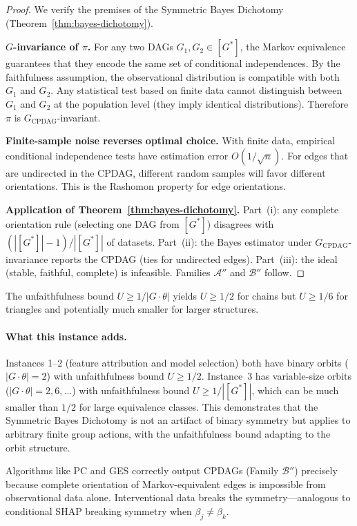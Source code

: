 \documentclass{article}
\begin{document}
\begin{proof}
We verify the premises of the Symmetric Bayes Dichotomy (Theorem~\ref{thm:bayes-dichotomy}).

\textbf{$G$-invariance of $\pi$.} For any two DAGs $G_1, G_2 \in [G^*]$, the Markov equivalence guarantees that they encode the same set of conditional independences. By the faithfulness assumption, the observational distribution is compatible with both $G_1$ and $G_2$. Any statistical test based on finite data cannot distinguish between $G_1$ and $G_2$ at the population level (they imply identical distributions). Therefore $\pi$ is $G_{\text{CPDAG}}$-invariant.

\textbf{Finite-sample noise reverses optimal choice.} With finite data, empirical conditional independence tests have estimation error $O(1/\sqrt{n})$. For edges that are undirected in the CPDAG, different random samples will favor different orientations. This is the Rashomon property for edge orientations.

\textbf{Application of Theorem~\ref{thm:bayes-dichotomy}.} Part~(i): any complete orientation rule (selecting one DAG from $[G^*]$) disagrees with $(|[G^*]|-1)/|[G^*]|$ of datasets. Part~(ii): the Bayes estimator under $G_{\text{CPDAG}}$-invariance reports the CPDAG (ties for undirected edges). Part~(iii): the ideal (stable, faithful, complete) is infeasible. Families $\mathcal{A}''$ and $\mathcal{B}''$ follow.
\end{proof}

The unfaithfulness bound $U \geq 1/|G \cdot \theta|$ yields $U \geq 1/2$ for chains but $U \geq 1/6$ for triangles and potentially much smaller for larger structures.

\paragraph{What this instance adds.}
Instances 1--2 (feature attribution and model selection) both have binary orbits ($|G \cdot \theta| = 2$) with unfaithfulness bound $U \geq 1/2$. Instance~3 has variable-size orbits ($|G \cdot \theta| = 2, 6, \ldots$) with unfaithfulness bound $U \geq 1/|[G^*]|$, which can be much smaller than $1/2$ for large equivalence classes. This demonstrates that the Symmetric Bayes Dichotomy is not an artifact of binary symmetry but applies to arbitrary finite group actions, with the unfaithfulness bound adapting to the orbit structure.

Algorithms like PC and GES correctly output CPDAGs (Family $\mathcal{B}''$) precisely because complete orientation of Markov-equivalent edges is impossible from observational data alone. Interventional data breaks the symmetry---analogous to conditional SHAP breaking symmetry when $\beta_j \neq \beta_k$.
\end{document}
